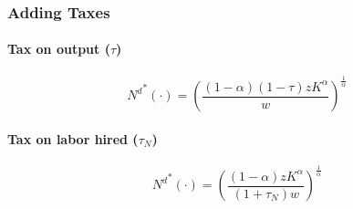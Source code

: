 \documentclass[11pt]{article}
\begin{document}
\subsubsection{Adding Taxes}
\paragraph{Tax on output ($\tau$)}
\begin{equation}
	{N^d}^*(\cdot) = (\frac{(1-\alpha)(1-\tau)z K^\alpha}{w})^{\frac{1}{\alpha}}
\end{equation}

\paragraph{Tax on labor hired ($\tau_N$)}
\begin{equation}
	{N^d}^*(\cdot) = (\frac{(1-\alpha)z K^\alpha}{(1 + \tau_N)w})^{\frac{1}{\alpha}}
\end{equation}
\end{document}
